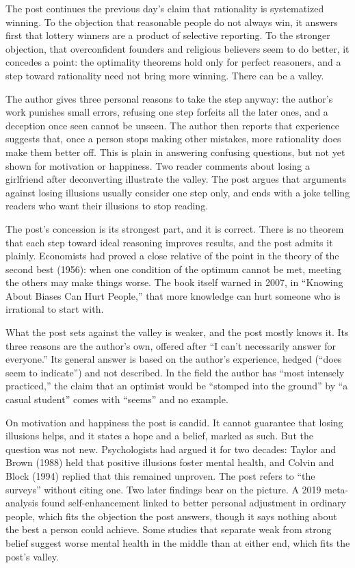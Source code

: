 \begin{afterword}
\summaryhead

The post continues the previous day's claim that rationality is systematized winning. To the objection that reasonable people do not always win, it answers first that lottery winners are a product of selective reporting. To the stronger objection, that overconfident founders and religious believers seem to do better, it concedes a point: the optimality theorems hold only for perfect reasoners, and a step toward rationality need not bring more winning. There can be a valley.

The author gives three personal reasons to take the step anyway: the author's work punishes small errors, refusing one step forfeits all the later ones, and a deception once seen cannot be unseen. The author then reports that experience suggests that, once a person stops making other mistakes, more rationality does make them better off. This is plain in answering confusing questions, but not yet shown for motivation or happiness. Two reader comments about losing a girlfriend after deconverting illustrate the valley. The post argues that arguments against losing illusions usually consider one step only, and ends with a joke telling readers who want their illusions to stop reading.

\responsehead

The post's concession is its strongest part, and it is correct. There is no theorem that each step toward ideal reasoning improves results, and the post admits it plainly. Economists had proved a close relative of the point in the theory of the second best (1956): when one condition of the optimum cannot be met, meeting the others may make things worse. The book itself warned in 2007, in ``Knowing About Biases Can Hurt People,'' that more knowledge can hurt someone who is irrational to start with.

What the post sets against the valley is weaker, and the post mostly knows it. Its three reasons are the author's own, offered after ``I can't necessarily answer for everyone.'' Its general answer is based on the author's experience, hedged (``does seem to indicate'') and not described. In the field the author has ``most intensely practiced,'' the claim that an optimist would be ``stomped into the ground'' by ``a casual student'' comes with ``seems'' and no example.

On motivation and happiness the post is candid. It cannot guarantee that losing illusions helps, and it states a hope and a belief, marked as such. But the question was not new. Psychologists had argued it for two decades: Taylor and Brown (1988) held that positive illusions foster mental health, and Colvin and Block (1994) replied that this remained unproven. The post refers to ``the surveys'' without citing one. Two later findings bear on the picture. A 2019 meta-analysis found self-enhancement linked to better personal adjustment in ordinary people, which fits the objection the post answers, though it says nothing about the best a person could achieve. Some studies that separate weak from strong belief suggest worse mental health in the middle than at either end, which fits the post's valley.


\end{afterword}
